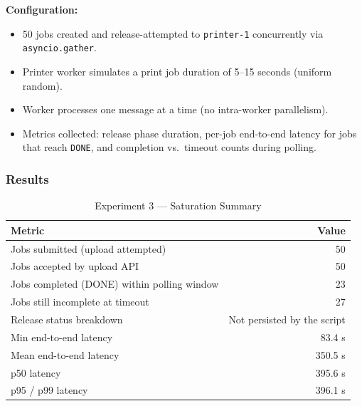 \documentclass[11pt,letterpaper]{article}
\newcommand{\code}[1]{\texttt{\small #1}}
\begin{document}
\textbf{Configuration:}
\begin{itemize}[noitemsep]
  \item 50 jobs created and release-attempted to \code{printer-1} concurrently via \code{asyncio.gather}.
  \item Printer worker simulates a print job duration of 5--15 seconds (uniform random).
  \item Worker processes one message at a time (no intra-worker parallelism).
  \item Metrics collected: release phase duration, per-job end-to-end latency for jobs that reach \texttt{DONE}, and completion vs.\ timeout counts during polling.
\end{itemize}

\subsubsection{Results}

\begin{table}[H]
\centering
\caption{Experiment 3 --- Saturation Summary}
\begin{tabular}{@{}lr@{}}
\toprule
\textbf{Metric} & \textbf{Value} \\
\midrule
Jobs submitted (upload attempted)         & 50 \\
Jobs accepted by upload API               & 50 \\
Jobs completed (DONE) within polling window & 23 \\
Jobs still incomplete at timeout          & 27 \\
Release status breakdown                  & Not persisted by the script \\
Min end-to-end latency                    & 83.4 s \\
Mean end-to-end latency                   & 350.5 s \\
p50 latency                               & 395.6 s \\
p95 / p99 latency                         & 396.1 s \\
\bottomrule
\end{tabular}
\end{table}
\end{document}
